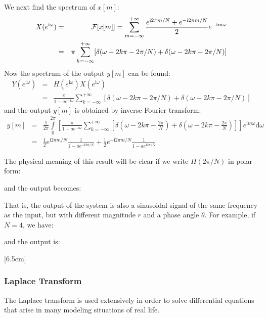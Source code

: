 \begin{itemize}
	We next find the spectrum of $x[m]$:
	\begin{eqnarray}
	X(e^{\mathrm{i}\omega}) &=& {\cal F}[x[m]]=\sum_{m=-\infty}^{+\infty} 
		\frac{e^{\mathrm{i}2\pi m/N}+e^{-\mathrm{i}2\pi m/N}}{2} e^{-\mathrm{i}m\omega}
		\nonumber \\
	 &=& \pi \sum_{k=-\infty}^{+\infty} [\delta(\omega-2k\pi-2\pi/N)+
			\delta(\omega-2k\pi-2\pi/N)]
		\nonumber
	\end{eqnarray}
	Now the spectrum of the output $y[m]$ can be found:
	\begin{eqnarray}
	Y(e^{\mathrm{i}\omega})&=& H(e^{\mathrm{i}\omega})X(e^{\mathrm{i}\omega})
		\nonumber \\
	 &=& \frac{\pi}{1-ae^{-\mathrm{i} \omega}}
		 \sum_{k=-\infty}^{+\infty} [\delta(\omega-2k\pi-2\pi/N)+
			\delta(\omega-2k\pi-2\pi/N)]
		\nonumber 
	\end{eqnarray}
	and the output $y[m]$ is obtained by inverse Fourier transform:
	\begin{eqnarray}
	y[m] &=& \frac{1}{2\pi} \int\limits_0^{2\pi} \left[\frac{\pi}{1-ae^{-\mathrm{i} \omega}}
	 \sum_{k=-\infty}^{+\infty} \left[\delta(\omega-2k\pi-\frac{2\pi}{N})+\delta(\omega-2k\pi-\frac{2\pi}{N})\right]\right]
		e^{\mathrm{i}m\omega} \mathrm{d}\omega
		\nonumber \\
	 &=& \frac{1}{2}e^{\mathrm{i}2\pi m/N}\frac{1}{1-ae^{-\mathrm{i}2\pi /N}}
		+\frac{1}{2}e^{-\mathrm{i}2\pi m/N}\frac{1}{1-ae^{\mathrm{i}2\pi /N}}	
		\nonumber
	\end{eqnarray}
	\end{itemize}
	
	The physical meaning of this result will be clear if we write $H(2\pi/N)$ in polar form:
	
	and the output becomes:
	
	That is, the output of the system is also a sinusoidal signal of the same 
	frequency as the input, but with different magnitude $r$ and a phase angle
	$\theta$. For example, if $N=4$, we have:
	
	and the output is:
	
	
	[6.5cm]
	
	\pagebreak
	\subsubsection{Laplace Transform}
	The Laplace transform is used extensively in order to solve  differential equations that arise in many modeling situations of real life. 

